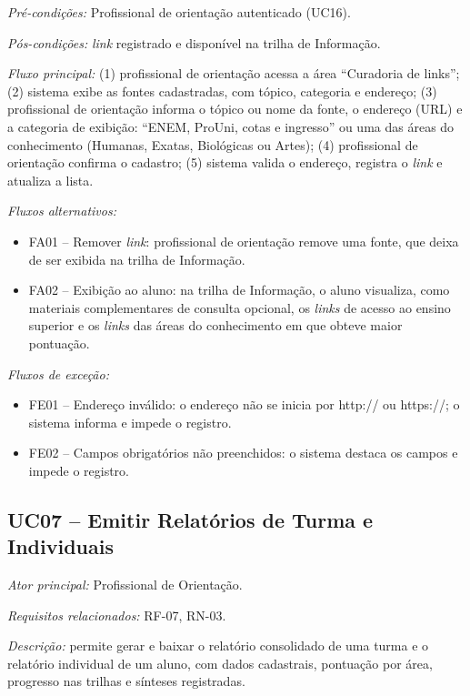 \textit{Pré-condições:} Profissional de orientação autenticado (UC16).

\textit{Pós-condições:} \textit{link} registrado e disponível na trilha de Informação.

\textit{Fluxo principal:} (1) profissional de orientação acessa a área ``Curadoria de links''; (2) sistema exibe as fontes cadastradas, com tópico, categoria e endereço; (3) profissional de orientação informa o tópico ou nome da fonte, o endereço (URL) e a categoria de exibição: ``ENEM, ProUni, cotas e ingresso'' ou uma das áreas do conhecimento (Humanas, Exatas, Biológicas ou Artes); (4) profissional de orientação confirma o cadastro; (5) sistema valida o endereço, registra o \textit{link} e atualiza a lista.

\textit{Fluxos alternativos:}

\begin{itemize}[label={},leftmargin=\parindent,itemsep=0pt,topsep=0pt]
  \item FA01 – Remover \textit{link}: profissional de orientação remove uma fonte, que deixa de ser exibida na trilha de Informação.
  \item FA02 – Exibição ao aluno: na trilha de Informação, o aluno visualiza, como materiais complementares de consulta opcional, os \textit{links} de acesso ao ensino superior e os \textit{links} das áreas do conhecimento em que obteve maior pontuação.
\end{itemize}

\textit{Fluxos de exceção:}

\begin{itemize}[label={},leftmargin=\parindent,itemsep=0pt,topsep=0pt]
  \item FE01 – Endereço inválido: o endereço não se inicia por http:// ou https://; o sistema informa e impede o registro.
  \item FE02 – Campos obrigatórios não preenchidos: o sistema destaca os campos e impede o registro.
\end{itemize}

\subsection*{UC07 -- Emitir Relatórios de Turma e Individuais}\label{uc:uc07}

\textit{Ator principal:} Profissional de Orientação.

\textit{Requisitos relacionados:} RF-07, RN-03.

\textit{Descrição:} permite gerar e baixar o relatório consolidado de uma turma e o relatório individual de um aluno, com dados cadastrais, pontuação por área, progresso nas trilhas e sínteses registradas.

